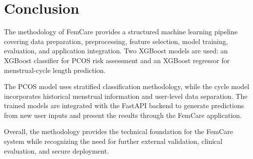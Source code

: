 \section{Conclusion}
\label{sec:Concl}
The methodology of FemCare provides a structured machine learning pipeline covering data preparation, preprocessing, feature selection, model training, evaluation, and application integration. Two XGBoost models are used: an XGBoost classifier for PCOS risk assessment and an XGBoost regressor for menstrual-cycle length prediction.

The PCOS model uses stratified classification methodology, while the cycle model incorporates historical menstrual information and user-level data separation. The trained models are integrated with the FastAPI backend to generate predictions from new user inputs and present the results through the FemCare application.

Overall, the methodology provides the technical foundation for the FemCare system while recognizing the need for further external validation, clinical evaluation, and secure deployment.








